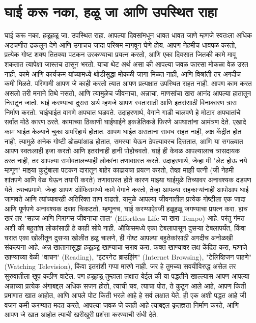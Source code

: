  \chapter{घाई करू नका, हळू जा आणि उपस्थित राहा}
घाई करू नका. हळूहळू जा. उपस्थित राहा.
 आपल्या दिवसांमधून धावत धावत जाणे म्हणजे स्वतःला अधिक अडचणीत ढकलून देणे आणि उगाचच जादा परिश्रम मागवून घेणे होय.
आपण नेहमीच धावपळ करतो, प्रत्येक गोष्ट शक्य तितक्या पटकन उरकण्याचा प्रयत्न करतो, आणि एका दिवसात जितकी कामे मावू शकतात त्यापेक्षा जास्तच ठासून भरतो. याचा थेट अर्थ असा की आपल्या जवळ फारसा मोकळा वेळ उरत नाही, कामे आणि कार्यक्रम यांच्यामध्ये थोडीसुद्धा मोकळी जागा मिळत नाही, आणि विश्रांती तर अगदीच कमी मिळते. परिणामी आपण जे काही करतो त्यात आपण प्रत्यक्षात उपस्थित राहत नाही. आपण काम करत असलो तरी मनाने तिथे नसतो, आणि त्यामुळेच जीवनाचा, अन्नाचा, माणसांचा खरा आनंद आपल्या हातातून निसटून जातो.
घाई करण्याचा दुसरा अर्थ म्हणजे आपण स्वतःसाठी आणि इतरांसाठी विनाकारण त्रास निर्माण करतो. घाईघाईत वागणे अपघात घडवते. उदाहरणार्थ, वेगाने गाडी चालवणे हे मोटार अपघातांचे सर्वांत मोठे कारण ठरते. कामाच्या ठिकाणी घाईघाईने इकडेतिकडे फिरणे अपघातांना आमंत्रण देते. एखादे काम घाईत केल्याने चुका अपरिहार्य होतात. आपण घाईत असताना सावध राहत नाही, लक्ष केंद्रीत होत नाही, त्यामुळे अनेक गोष्टी डोळ्यांआड होतात, समस्या येऊन ठेपल्यावरच दिसतात, आणि या सगळ्यात आपण स्वतःलाही इजा करतो आणि इतरांनाही हानी पोहोचवतो.
घाई ही केवळ आपल्यालाच त्रासदायक ठरत नाही, तर आपल्या सभोवतालच्याही लोकांना तणावग्रस्त करते. उदाहरणार्थ, जेव्हा मी "लेट होऊ नये म्हणून" माझ्या कुटुंबाला पटकन दारातून बाहेर काढायचा प्रयत्न करतो, तेव्हा माझी पत्नी (जी नेहमी शांतपणे आणि वेळ घेऊन तयारी करते) तणावग्रस्त होते कारण माझ्या घाईमुळे तिच्यावर अनावश्यक दडपण येते. त्याचप्रमाणे, जेव्हा आपण ऑफिसमध्ये कामे वेगाने करतो, तेव्हा आपल्या सहकाऱ्यांनाही आपोआप घाई जाणवते आणि त्यांच्यावरही अतिरिक्त ताण वाढतो. यामुळे आपल्या जीवनातील प्रत्येक गोष्टीला एक जादा आणि पूर्णपणे अनावश्यक दबाव चिकटतो.
म्हणूनच, घाई करण्याऐवजी हळूहळू जगण्याचा प्रयत्न करा. हाच खरं तर "सहज आणि निरागस जीवनाचा ताल" (Effortless Life चा खरा Tempo) आहे. परंतु गंमत अशी की बहुतांश लोकांसाठी हे काही सोपे नाही. ऑफिसमध्ये एका टेबलापासून दुसऱ्या टेबलापर्यंत, किंवा घरात एका खोलीतून दुसऱ्या खोलीत हळू चालणे,  ही गोष्ट आपल्या बहुतेकांसाठी अगदीच अनोळखी संकल्पना आहे.
अन्न खातानासुद्धा हळूहळू खाण्याचा सराव करा. फक्त खाण्यावर लक्ष केंद्रित करा,  म्हणजे खाण्याच्या वेळी "वाचन" (Reading), "इंटरनेट ब्राउझिंग" (Internet Browsing), "टेलिव्हिजन पाहणे" (Watching Television), किंवा इतरांशी गप्पा मारणे नाही. जर हे तुमच्या सवयीविरुद्ध असेल तर सुरुवातीला खूप कठीण वाटेल. पण हळूहळू तुम्हाला लक्षात येईल की या पद्धतीने खाल्ल्यास आपण आपल्या अन्नाच्या प्रत्येक अंगाबद्दल अधिक सजग होतो,  त्याची चव, त्याचा पोत, ते कुठून आले आहे, आपण किती प्रमाणात खात आहोत, आणि आपले पोट किती भरले आहे हे सर्व लक्षात येते. ही एक अशी पद्धत आहे जी वजन कमी करण्यात मदत करते, आपल्या जवळ जे काही आहे त्याबद्दल कृतज्ञता निर्माण करते, आणि आपण जे खात आहोत त्याची खरीखुरी प्रशंसा करण्याची संधी देते.

